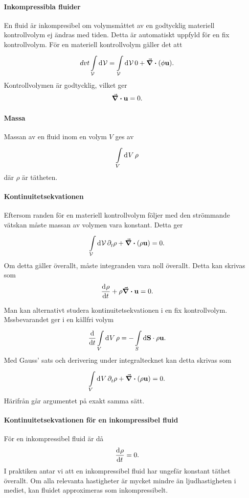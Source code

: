 \paragraph{Inkompressibla fluider}
En fluid är inkompresibel om volymsmåttet av en godtycklig materiell kontrollvolym ej ändras med tiden. Detta är automatiskt uppfyld för en fix kontrollvolym. För en materiell kontrollvolym gäller det att
\begin{align*}
	dv{t}\int\limits_{\mathcal{V}}^{}\dd[]{\mathcal{V}} = \int\limits_{\mathcal{V}}^{}\dd[]{\mathcal{V}}0 + \div(\phi\vb{u}).
\end{align*}
Kontrollvolymen är godtycklig, vilket ger
\begin{align*}
	\div{\vb{u}} = 0.
\end{align*}

\paragraph{Massa}
Massan av en fluid inom en volym $V$ ges av
\begin{align*}
	\int\limits_{V}^{}\dd[]{V}\rho
\end{align*}
där $\rho$ är tätheten.

\paragraph{Kontinuitetsekvationen}
Eftersom randen för en materiell kontrollvolym följer med den strömmande vätskan måste massan av volymen vara konstant. Detta ger
\begin{align*}
	\int\limits_{\mathcal{V}}^{}\dd[]{\mathcal{V}}\partial_{t}^{}\rho + \div(\rho\vb{u}) = 0.
\end{align*}
Om detta gäller överallt, måste integranden vara noll överallt. Detta kan skrivas som
\begin{align*}
	\dv[]{\rho}{t} + \rho\div{\vb{u}} = 0.
\end{align*}

Man kan alternativt studera kontinuitetsekvationen i en fix kontrollvolym. Mssbevarandet ger i en källfri volym
\begin{align*}
	\dv{t}\int\limits_{V}^{}\dd[]{V}\rho = -\int\limits_{S}^{}\dd{\vb{S}}\cdot \rho\vb{u}.
\end{align*}
Med Gauss' sats och derivering under integraltecknet kan detta skrivas som
\begin{align*}
	\int\limits_{V}^{}\dd[]{V}\partial_{t}^{}\rho + \div(\rho\vb{u}) = 0.
\end{align*}
Härifrån går argumentet på exakt samma sätt.

\paragraph{Kontinuitetsekvationen för en inkompressibel fluid}
För en inkompressibel fluid är då
\begin{align*}
	\dv[]{\rho}{t} = 0.
\end{align*}
I praktiken antar vi att en inkompressibel fluid har ungefär konstant täthet överallt. Om alla relevanta hastigheter är mycket mindre än ljudhastigheten i mediet, kan fluidet approximeras som inkompressibelt.

